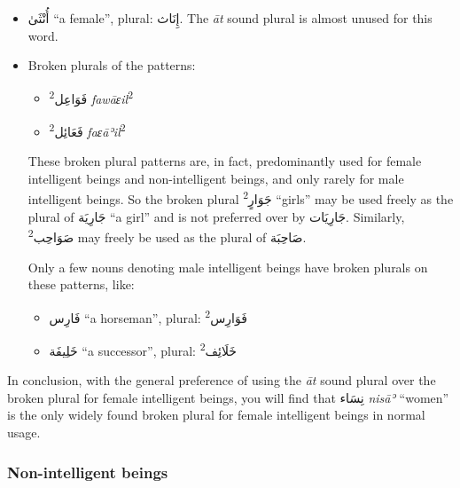 \documentclass[
  10pt,
]{book}
\providecommand{\tightlist}{%
  \setlength{\itemsep}{0pt}\setlength{\parskip}{0pt}}
\begin{document}
\begin{itemize}
\item
  \foreignlanguage{arabic}{أُنْثَىٰ} \enquote{a female}, plural: \foreignlanguage{arabic}{إِنَاث}. The \emph{āt} sound plural is almost unused for this word.
\item
  Broken plurals of the patterns:

  \begin{itemize}
  \tightlist
  \item
    \textsuperscript{2}\foreignlanguage{arabic}{فَوَاعِل} \emph{fawāɛil}\textsuperscript{2}
  \item
    \textsuperscript{2}\foreignlanguage{arabic}{فَعَائِل} \emph{faɛāʾil}\textsuperscript{2}
  \end{itemize}

  These broken plural patterns are, in fact, predominantly used for female intelligent beings and non-intelligent beings, and only rarely for male intelligent beings. So the broken plural \textsuperscript{2}\foreignlanguage{arabic}{جَوَارٍ} \enquote{girls} may be used freely as the plural of \foreignlanguage{arabic}{جَارِيَة} \enquote{a girl} and is not preferred over by \foreignlanguage{arabic}{جَارِيَات}. Similarly, \textsuperscript{2}\foreignlanguage{arabic}{صَوَاحِب} may freely be used as the plural of \foreignlanguage{arabic}{صَاحِبَة}.

  Only a few nouns denoting male intelligent beings have broken plurals on these patterns, like:

  \begin{itemize}
  \tightlist
  \item
    \foreignlanguage{arabic}{فَارِس} \enquote{a horseman}, plural: \textsuperscript{2}\foreignlanguage{arabic}{فَوَارِس}
  \item
    \foreignlanguage{arabic}{خَلِيفَة} \enquote{a successor}, plural: \textsuperscript{2}\foreignlanguage{arabic}{خَلَائِف}
  \end{itemize}
\end{itemize}

In conclusion, with the general preference of using the \emph{āt} sound plural over the broken plural for female intelligent beings, you will find that \foreignlanguage{arabic}{نِسَاء} \emph{nisāʾ} \enquote{women} is the only widely found broken plural for female intelligent beings in normal usage.

\subsubsection{Non-intelligent beings}\label{non-intelligent-beings}
\end{document}
